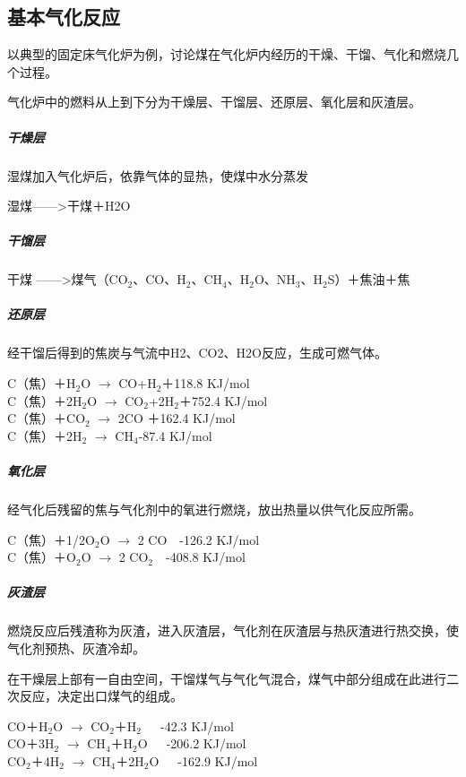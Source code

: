 \documentclass[10pt,openany]{ctexbook}
\begin{document}
\subsection{基本气化反应}
以典型的固定床气化炉为例，讨论煤在气化炉内经历的干燥、干馏、气化和燃烧几个过程。\par
气化炉中的燃料从上到下分为干燥层、干馏层、还原层、氧化层和灰渣层。
\subparagraph{干燥层}
湿煤加入气化炉后，依靠气体的显热，使煤中水分蒸发
\begin{center}
 湿煤——>干煤＋H2O

\end{center}
\subparagraph{干馏层}
\begin{center}
干煤 ——>煤气（CO$_2$、CO、H$_2$、CH$_4$、H$_2$O、NH$_3$、H$_2$S）＋焦油＋焦
\end{center}
\subparagraph{还原层}
经干馏后得到的焦炭与气流中H2、CO2、H2O反应，生成可燃气体。
\begin{center}
C（焦）＋H$_2$O  $\longrightarrow  $     CO+H$_2$＋118.8 KJ/mol    \\
C（焦）＋2H$_2$O $ \longrightarrow $     CO$_2$+2H$_2$＋752.4 KJ/mol   \\
C（焦）＋CO$_2$  $\longrightarrow  $     2CO ＋162.4 KJ/mol\\
C（焦）＋2H$_2$  $\longrightarrow  $     CH$_4$-87.4 KJ/mol\\

\end{center}
\subparagraph{氧化层}
经气化后残留的焦与气化剂中的氧进行燃烧，放出热量以供气化反应所需。
\begin{center}
C（焦）＋1/2O$_2$O  $\longrightarrow  $    2       CO~~-126.2 KJ/mol        \\
C（焦）＋O$_2$O $ \longrightarrow $     2        CO$_2$~~-408.8 KJ/mol   \\


\end{center}
\subparagraph{灰渣层}
燃烧反应后残渣称为灰渣，进入灰渣层，气化剂在灰渣层与热灰渣进行热交换，使气化剂预热、灰渣冷却。\par
    在干燥层上部有一自由空间，干馏煤气与气化气混合，煤气中部分组成在此进行二次反应，决定出口煤气的组成。
\begin{center}
CO＋H$_2$O $\longrightarrow  $     CO$_2$＋H$_2$~~~-42.3 KJ/mol     \\
CO＋3H$_2$ $\longrightarrow $     CH$_4$＋H$_2$O~~~-206.2 KJ/mol    \\
CO$_2$＋4H$_2$      $ \longrightarrow  $    CH$_4$＋2H$_2$O~~~-162.9 KJ/mol


\end{center}
\end{document}

